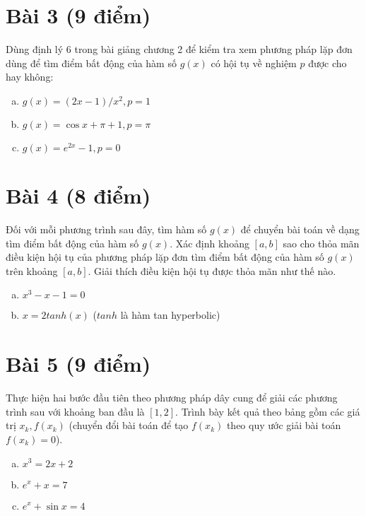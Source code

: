 \documentclass[12pt]{article}
\begin{document}
\section{Bài 3 (9 điểm)}
Dùng định lý 6 trong bài giảng chương 2 để kiểm tra xem phương pháp lặp đơn dùng để tìm điểm bất động của hàm số $g(x)$ có hội tụ về nghiệm $p$ được cho hay không:

\begin{enumerate}[a)]
\item $g(x) = (2x-1)/x^2, p = 1$

\item $g(x) = \cos x + \pi + 1, p = \pi$

\item $g(x) = e^{2x} - 1, p = 0$

\end{enumerate}

\section{Bài 4 (8 điểm)}
Đối với mỗi phương trình sau đây, tìm hàm số $g(x)$ để chuyển bài toán về dạng tìm điểm bất động của hàm số $g(x)$. Xác định khoảng $[a,b]$ sao cho thỏa mãn điều kiện hội tụ của phương pháp lặp đơn tìm điểm bất động của hàm số $g(x)$ trên khoảng $[a,b]$. Giải thích điều kiện hội tụ được thỏa mãn như thế nào.

\begin{enumerate}[a)]
\item $x^3-x-1=0$

\item $x=2tanh(x)$ ($tanh$ là hàm tan hyperbolic)

\end{enumerate}


\section{Bài 5 (9 điểm)}
Thực hiện hai bước đầu tiên theo phương pháp dây cung để giải các phương trình sau với khoảng ban đầu là $[1,2]$. Trình bày kết quả theo bảng gồm các giá trị $x_k, f(x_k)$ (chuyển đổi bài toán để tạo $f(x_k)$ theo quy ước giải bài toán $f(x_k)=0$).

\begin{enumerate}[a)]
\item $x^3 = 2x + 2$

\item $e^x + x = 7$

\item $e^x + \sin x = 4$

\end{enumerate}
\end{document}
